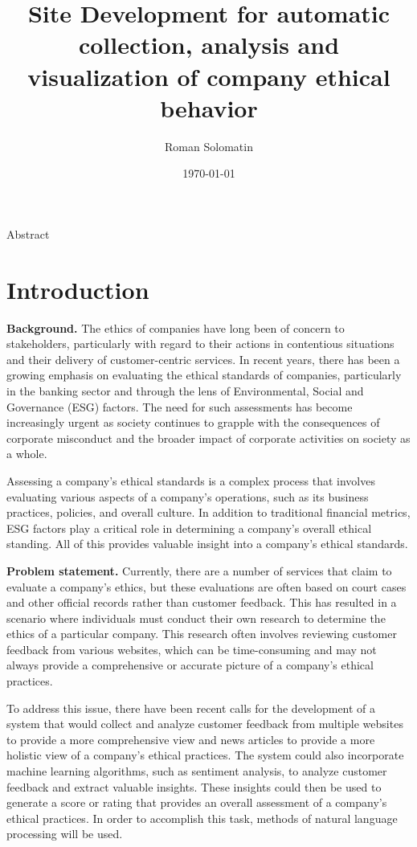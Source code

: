 \documentclass[PI]{ProjectProposal}
\author{Roman Solomatin}
\date{\today}
\title{Site Development for automatic collection, analysis and visualization of company ethical behavior}
\begin{document}
\maketitle
Abstract

\chapter{Introduction}
\label{sec:orge0c4354}
\textbf{Background.} The ethics of companies have long been of concern to stakeholders, particularly with regard to their actions in contentious situations and their delivery of customer-centric services. In recent years, there has been a growing emphasis on evaluating the ethical standards of companies, particularly in the banking sector and through the lens of Environmental, Social and Governance (ESG) factors\autocites{mure_esg_2021}[][]{miralles-quiros_esg_2019}[][]{climent_ethical_2018}. The need for such assessments has become increasingly urgent as society continues to grapple with the consequences of corporate misconduct and the broader impact of corporate activities on society as a whole.

Assessing a company's ethical standards is a complex process that involves evaluating various aspects of a company's operations, such as its business practices, policies, and overall culture. In addition to traditional financial metrics, ESG factors play a critical role in determining a company's overall ethical standing. All of this provides valuable insight into a company's ethical standards.

\textbf{Problem statement.} Currently, there are a number of services that claim to evaluate a company's ethics, but these evaluations are often based on court cases and other official records rather than customer feedback. This has resulted in a scenario where individuals must conduct their own research to determine the ethics of a particular company. This research often involves reviewing customer feedback from various websites, which can be time-consuming and may not always provide a comprehensive or accurate picture of a company's ethical practices.

To address this issue, there have been recent calls for the development of a system that would collect and analyze customer feedback from multiple websites to provide a more comprehensive view and news articles to provide a more holistic view of a company's ethical practices. The system could also incorporate machine learning algorithms, such as sentiment analysis, to analyze customer feedback and extract valuable insights. These insights could then be used to generate a score or rating that provides an overall assessment of a company's ethical practices. In order to accomplish this task, methods of natural language processing will be used.
\end{document}
